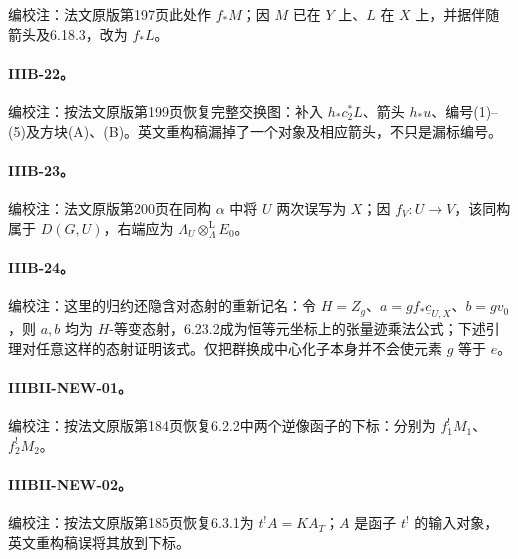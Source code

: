 编校注：法文原版第197页此处作 $f_*M$；因 $M$ 已在 $Y$ 上、$L$ 在 $X$ 上，并据伴随箭头及6.18.3，改为 $f_*L$。

\hypertarget{collation-IIIB-22}{}

\paragraph*{IIIB-22。}

编校注：按法文原版第199页恢复完整交换图：补入 $h_*c_2^*L$、箭头 $h_*u$、编号(1)--(5)及方块(A)、(B)。英文重构稿漏掉了一个对象及相应箭头，不只是漏标编号。

\hypertarget{collation-IIIB-23}{}

\paragraph*{IIIB-23。}

编校注：法文原版第200页在同构 $\alpha$ 中将 $U$ 两次误写为 $X$；因 $f_V:U\to V$，该同构属于 $D(G,U)$，右端应为 $\Lambda_U\otimes^{\mathrm L}_{\Lambda}E_0$。

\hypertarget{collation-IIIB-24}{}

\paragraph*{IIIB-24。}

编校注：这里的归约还隐含对态射的重新记名：令 $H=Z_g$、$a=g f_*\underline c_{U,X}$、$b=gv_0$，则 $a,b$ 均为 $H$-等变态射，6.23.2成为恒等元坐标上的张量迹乘法公式；下述引理对任意这样的态射证明该式。仅把群换成中心化子本身并不会使元素 $g$ 等于 $e$。

\hypertarget{collation-IIIBII-NEW-01}{}

\paragraph*{IIIBII-NEW-01。}

编校注：按法文原版第184页恢复6.2.2中两个逆像函子的下标：分别为 $f_1^!M_1$、$f_2^!M_2$。

\hypertarget{collation-IIIBII-NEW-02}{}

\paragraph*{IIIBII-NEW-02。}

编校注：按法文原版第185页恢复6.3.1为 $t^!A=KA_T$；$A$ 是函子 $t^!$ 的输入对象，英文重构稿误将其放到下标。

